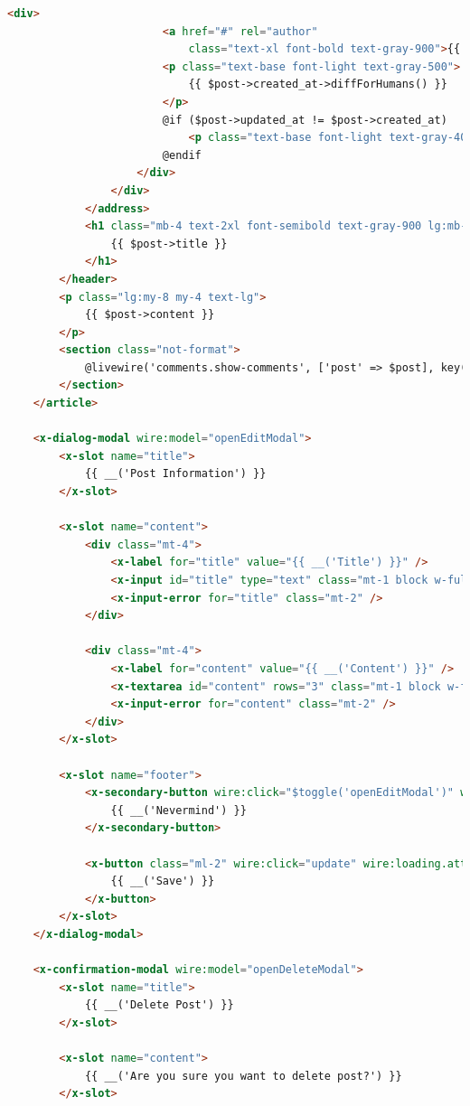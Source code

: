 \begin{lstlisting}[caption={\texttt{show-post.blade.php} - Blade datoteka Livewire komponente}, label=showPostBlade, language=HTML, escapechar=|]
                    <div>
                        <a href="#" rel="author"
                            class="text-xl font-bold text-gray-900">{{ $post->user->name }}</a>
                        <p class="text-base font-light text-gray-500">
                            {{ $post->created_at->diffForHumans() }}
                        </p>
                        @if ($post->updated_at != $post->created_at)
                            <p class="text-base font-light text-gray-400">{{ __('Edited') }}</p>
                        @endif
                    </div>
                </div>
            </address>
            <h1 class="mb-4 text-2xl font-semibold text-gray-900 lg:mb-6 lg:text-4xl">
                {{ $post->title }}
            </h1>
        </header>
        <p class="lg:my-8 my-4 text-lg">
            {{ $post->content }}
        </p>
        <section class="not-format">
            @livewire('comments.show-comments', ['post' => $post], key($post->id))|\label{line:include}|
        </section>
    </article>

    <x-dialog-modal wire:model="openEditModal">
        <x-slot name="title">
            {{ __('Post Information') }}
        </x-slot>

        <x-slot name="content">
            <div class="mt-4">
                <x-label for="title" value="{{ __('Title') }}" />
                <x-input id="title" type="text" class="mt-1 block w-full" wire:model.defer="title" />
                <x-input-error for="title" class="mt-2" />
            </div>

            <div class="mt-4">
                <x-label for="content" value="{{ __('Content') }}" />
                <x-textarea id="content" rows="3" class="mt-1 block w-full" wire:model.defer="content" />
                <x-input-error for="content" class="mt-2" />
            </div>
        </x-slot>

        <x-slot name="footer">
            <x-secondary-button wire:click="$toggle('openEditModal')" wire:loading.attr="disabled">
                {{ __('Nevermind') }}
            </x-secondary-button>

            <x-button class="ml-2" wire:click="update" wire:loading.attr="disabled">
                {{ __('Save') }}
            </x-button>
        </x-slot>
    </x-dialog-modal>

    <x-confirmation-modal wire:model="openDeleteModal">
        <x-slot name="title">
            {{ __('Delete Post') }}
        </x-slot>

        <x-slot name="content">
            {{ __('Are you sure you want to delete post?') }}
        </x-slot>


\end{lstlisting}
